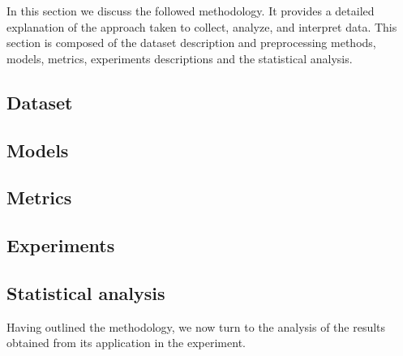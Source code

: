 
In this section we discuss the followed methodology. It provides a detailed explanation of the approach taken to collect, analyze, and interpret data. This section is composed of the dataset description and preprocessing methods, models, metrics, experiments descriptions and the statistical analysis.

\subsection{Dataset}


\subsection{Models}


\subsection{Metrics}


\subsection{Experiments}


\subsection{Statistical analysis}


Having outlined the methodology, we now turn to the analysis of the results obtained from its application in the experiment.